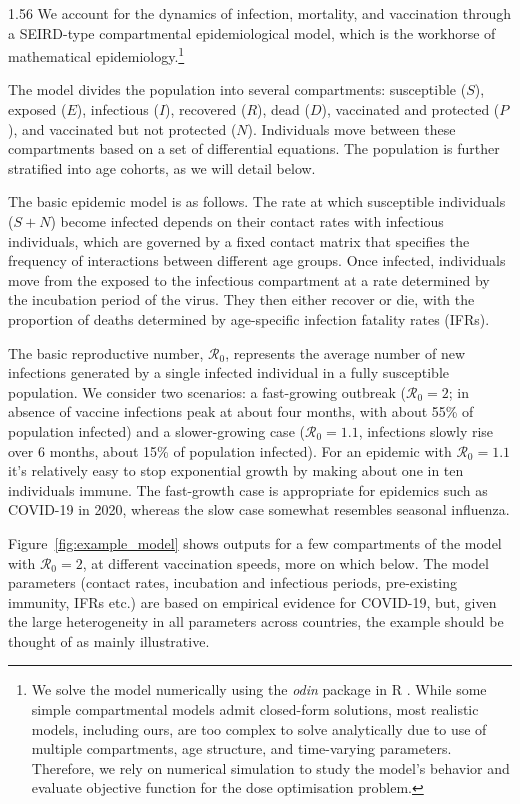 \documentclass[12pt]{article}
\begin{document}
\begin{spacing}{1.56}
We account for the dynamics of infection, mortality, and vaccination through a SEIRD-type compartmental epidemiological model, which is the workhorse of mathematical epidemiology.\footnote{We solve the model numerically using the \textit{odin} package in R \cite{odin}. While some simple compartmental models admit closed-form solutions, most realistic models, including ours, are too complex to solve analytically due to use of multiple compartments, age structure, and time-varying parameters. Therefore, we rely on numerical simulation to study the model's behavior and evaluate objective function for the dose optimisation problem.} 

The model divides the population into several compartments: susceptible ($S$), exposed ($E$), infectious ($I$), recovered ($R$), dead ($D$), vaccinated and protected ($P$), and vaccinated but not protected ($N$). Individuals move between these compartments based on a set of differential equations. The population is further stratified into age cohorts, as we will detail below.

The basic epidemic model is as follows. The rate at which susceptible individuals ($S + N$) become infected depends on their contact rates with infectious individuals, which are governed by a fixed contact matrix that specifies the frequency of interactions between different age groups. Once infected, individuals move from the exposed to the infectious compartment at a rate determined by the incubation period of the virus. They then either recover or die, with the proportion of deaths determined by age-specific infection fatality rates (IFRs). 

The basic reproductive number, $\mathcal{R}_0$, represents the average number of new infections generated by a single infected individual in a fully susceptible population. We consider two scenarios: a fast-growing outbreak ($\mathcal{R}_0 = 2$; in absence of vaccine infections peak at about four months, with about 55\% of population infected) and a slower-growing case ($\mathcal{R}_0 = 1.1$, infections slowly rise over 6 months, about 15\% of population infected). For an epidemic with $\mathcal{R}_0 = 1.1$ it's relatively easy to stop exponential growth by making about one in ten individuals immune. The fast-growth case is appropriate for epidemics such as COVID-19 in 2020, whereas the slow case somewhat resembles seasonal influenza.

Figure~\ref{fig:example_model} shows outputs for a few compartments of the model with $\mathcal{R}_0 = 2$, at different vaccination speeds, more on which below. The model parameters (contact rates, incubation and infectious periods, pre-existing immunity, IFRs etc.) are based on empirical evidence for COVID-19, but, given the large heterogeneity in all parameters across countries, the example should be thought of as mainly illustrative. 


\end{spacing}
\end{document}
